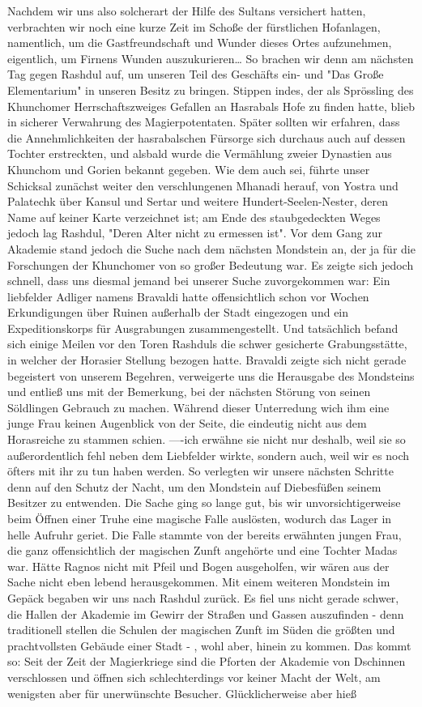 Nachdem wir uns also solcherart der Hilfe des Sultans versichert hatten, verbrachten wir noch eine kurze Zeit im Schoße der fürstlichen Hofanlagen, namentlich, um die Gastfreundschaft und Wunder dieses Ortes aufzunehmen, eigentlich, um Firnens Wunden auszukurieren\dots
So brachen wir denn am nächsten Tag gegen Rashdul auf, um unseren Teil des Geschäfts ein- und "Das Große Elementarium" in unseren Besitz zu bringen. Stippen indes, der als Sprössling des Khunchomer Herrschaftszweiges Gefallen an Hasrabals Hofe zu finden hatte, blieb in sicherer Verwahrung des Magierpotentaten. Später sollten wir erfahren, dass die Annehmlichkeiten der hasrabalschen Fürsorge sich durchaus auch auf dessen Tochter erstreckten, und alsbald wurde die Vermählung zweier Dynastien aus Khunchom und Gorien bekannt gegeben.
Wie dem auch sei, führte unser Schicksal zunächst weiter den verschlungenen Mhanadi herauf, von Yostra und Palatechk über Kansul und Sertar und weitere Hundert-Seelen-Nester, deren Name auf keiner Karte verzeichnet ist; am Ende des staubgedeckten Weges jedoch lag Rashdul, "Deren Alter nicht zu ermessen ist". Vor dem Gang zur Akademie stand jedoch die Suche nach dem nächsten Mondstein an, der ja für die Forschungen der Khunchomer von so großer Bedeutung war. Es zeigte sich jedoch schnell, dass uns diesmal jemand bei unserer Suche zuvorgekommen war: Ein liebfelder Adliger namens Bravaldi hatte offensichtlich schon vor Wochen Erkundigungen über Ruinen außerhalb der Stadt eingezogen und ein Expeditionskorps für Ausgrabungen zusammengestellt. Und tatsächlich befand sich einige Meilen vor den Toren Rashduls die schwer gesicherte Grabungsstätte, in welcher der Horasier Stellung bezogen hatte. Bravaldi zeigte sich nicht gerade begeistert von unserem Begehren, verweigerte uns die Herausgabe des Mondsteins und entließ uns mit der Bemerkung, bei der nächsten Störung von seinen Söldlingen Gebrauch zu machen. Während dieser Unterredung wich ihm eine junge Frau keinen Augenblick von der Seite, die eindeutig nicht aus dem Horasreiche zu stammen schien. ----ich erwähne sie nicht nur deshalb, weil sie so außerordentlich fehl neben dem Liebfelder wirkte, sondern auch, weil wir es noch öfters mit ihr zu tun haben werden. So verlegten wir unsere nächsten Schritte denn auf den Schutz der Nacht, um den Mondstein auf Diebesfüßen seinem Besitzer zu entwenden. Die Sache ging so lange gut, bis wir unvorsichtigerweise beim Öffnen einer Truhe eine magische Falle auslösten, wodurch das Lager in helle Aufruhr geriet. Die Falle stammte von der bereits erwähnten jungen Frau, die ganz offensichtlich der magischen Zunft angehörte und eine Tochter Madas war. Hätte Ragnos nicht mit Pfeil und Bogen ausgeholfen, wir wären aus der Sache nicht eben lebend herausgekommen. Mit einem weiteren Mondstein im Gepäck begaben wir uns nach Rashdul zurück. Es fiel uns nicht gerade schwer, die Hallen der Akademie im Gewirr der Straßen und Gassen auszufinden - denn traditionell stellen die Schulen der magischen Zunft im Süden die größten und prachtvollsten Gebäude einer Stadt - , wohl aber, hinein zu kommen. Das kommt so: Seit der Zeit der Magierkriege sind die Pforten der Akademie von Dschinnen verschlossen und öffnen sich schlechterdings vor keiner Macht der Welt, am wenigsten aber für unerwünschte Besucher. Glücklicherweise aber hieß 